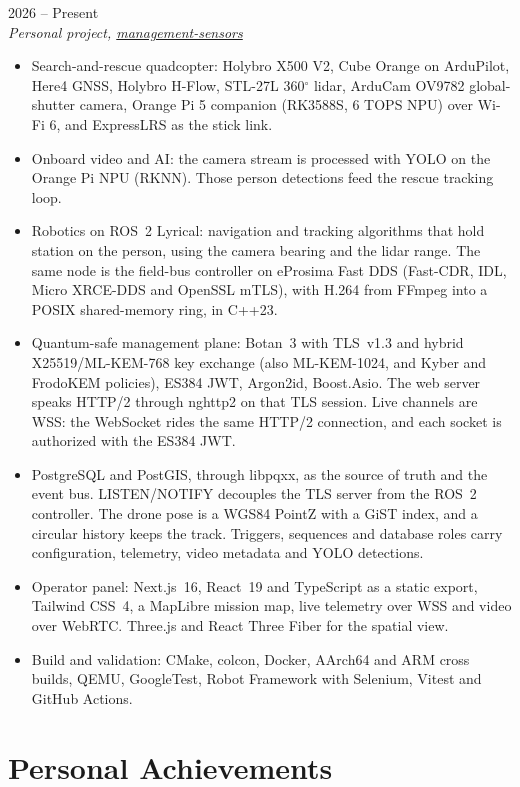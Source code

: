 \documentclass[11pt,a4paper]{article}
\newenvironment{job}[3]{%
  \vspace{0.55em}%
  \noindent{\bfseries #1}\hfill{\color{cvaccent}#2}\\[0.1em]
  \textit{#3}\par
  \begin{itemize}
}{%
  \end{itemize}
}
\begin{document}
\begin{job}{Rescue drone sensor platform}{2026 -- Present}{Personal project, \href{https://github.com/Investigacion-IA/management-sensors}{management-sensors}}
  \item Search-and-rescue quadcopter: Holybro X500 V2, Cube Orange on ArduPilot, Here4 GNSS, Holybro H-Flow, STL-27L 360$^\circ$ lidar, ArduCam OV9782 global-shutter camera, Orange Pi 5 companion (RK3588S, 6 TOPS NPU) over Wi-Fi 6, and ExpressLRS as the stick link.
  \item Onboard video and AI: the camera stream is processed with YOLO on the Orange Pi NPU (RKNN). Those person detections feed the rescue tracking loop.
  \item Robotics on ROS~2 Lyrical: navigation and tracking algorithms that hold station on the person, using the camera bearing and the lidar range. The same node is the field-bus controller on eProsima Fast DDS (Fast-CDR, IDL, Micro XRCE-DDS and OpenSSL mTLS), with H.264 from FFmpeg into a POSIX shared-memory ring, in C++23.
  \item Quantum-safe management plane: Botan~3 with TLS~v1.3 and hybrid X25519/ML-KEM-768 key exchange (also ML-KEM-1024, and Kyber and FrodoKEM policies), ES384 JWT, Argon2id, Boost.Asio. The web server speaks HTTP/2 through nghttp2 on that TLS session. Live channels are WSS: the WebSocket rides the same HTTP/2 connection, and each socket is authorized with the ES384 JWT.
  \item PostgreSQL and PostGIS, through libpqxx, as the source of truth and the event bus. LISTEN/NOTIFY decouples the TLS server from the ROS~2 controller. The drone pose is a WGS84 PointZ with a GiST index, and a circular history keeps the track. Triggers, sequences and database roles carry configuration, telemetry, video metadata and YOLO detections.
  \item Operator panel: Next.js~16, React~19 and TypeScript as a static export, Tailwind CSS~4, a MapLibre mission map, live telemetry over WSS and video over WebRTC. Three.js and React Three Fiber for the spatial view.
  \item Build and validation: CMake, colcon, Docker, AArch64 and ARM cross builds, QEMU, GoogleTest, Robot Framework with Selenium, Vitest and GitHub Actions.
\end{job}

\section{Personal Achievements}
\end{document}
